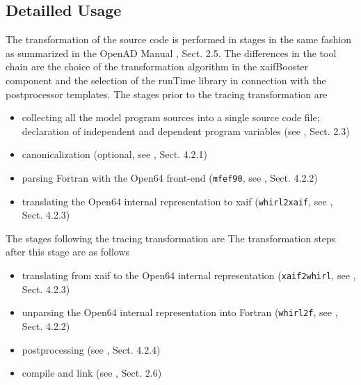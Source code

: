 \documentclass{article}
\begin{document}
\subsection{Detailled Usage}
The transformation of the source code is performed in stages in the same fashion as 
summarized in the OpenAD Manual \cite{userManual}, Sect. 2.5. 
The differences in the tool chain are the choice of the transformation algorithm 
in the xaifBooster component and the selection of the runTime library in connection with 
the postprocessor templates. 
The stages prior to the tracing transformation are 
\begin{itemize}
\item collecting all the model program sources into a  single source code file; declaration of independent and dependent program variables (see \cite{userManual}, Sect. 2.3)
\item canonicalization (optional, see \cite{userManual}, Sect. 4.2.1)
\item parsing Fortran with the Open64 front-end (\lstinline{mfef90}, see \cite{userManual}, Sect. 4.2.2)
\item translating the Open64 internal representation to xaif (\lstinline{whirl2xaif}, see \cite{userManual}, Sect. 4.2.3)
\end{itemize}
The stages following the tracing transformation are 
The transformation steps after this stage are as follows
\begin{itemize}
\item translating from xaif to the Open64 internal representation (\lstinline{xaif2whirl}, see \cite{userManual}, Sect. 4.2.3)
\item unparsing the Open64 internal representation into Fortran (\lstinline{whirl2f}, see \cite{userManual}, Sect. 4.2.2)
\item postprocessing (see \cite{userManual}, Sect. 4.2.4)
\item compile and link (see \cite{userManual}, Sect. 2.6)
\end{itemize}
\end{document}
